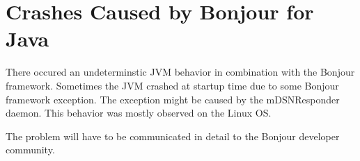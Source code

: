 \section{Crashes Caused by Bonjour for Java}
There occured an undeterminstic JVM behavior in combination with the Bonjour framework. Sometimes the JVM crashed at startup time due to some Bonjour framework exception. The exception might be caused by the mDSNResponder daemon. This behavior was mostly observed on the Linux OS. 

The problem will have to be communicated in detail to the Bonjour developer community.
